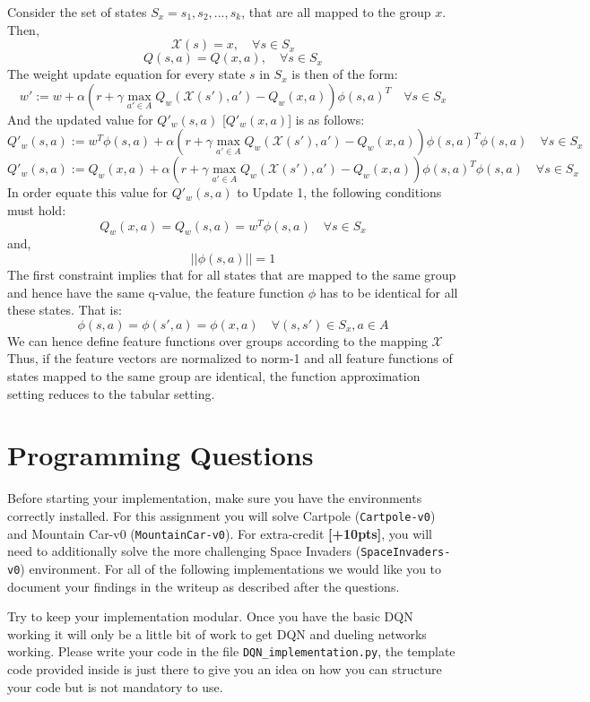 \documentclass[12pt]{article}
\begin{document}
\noindent

\begin{solution}
Consider the set of states $S_x = {s_1, s_2, ..., s_k}$, that are all mapped to the group $x$. Then, 
$$\mathcal{X}(s) = x, \quad \forall s \in S_x$$
$$Q(s,a) = Q(x,a), \quad \forall s \in S_x$$
The weight update equation for every state $s$ in $S_x$ is then of the form:
	$$w' := w + 
		\alpha \left( 
			r + \gamma \max _{a' \in A} Q _w(\mathcal{X}(s'), a') 
				- Q_w(x, a) 
		\right)\phi(s, a)^T \quad \forall s \in S_x $$
And the updated value for $Q'_{w}(s, a)$ [$Q'_{w}(x, a)$] is as follows:
	$$Q'_{w}(s, a) := w^T\phi(s, a) + 
		\alpha \left( 
			r + \gamma \max _{a' \in A} Q _w(\mathcal{X}(s'), a') 
				- Q _w(x, a) 
		\right)\phi(s, a)^T\phi(s, a) \quad \forall s \in S_x $$
	$$Q'_{w}(s, a) := Q_w(x,a) + 
		\alpha \left( 
			r + \gamma \max _{a' \in A} Q _w(\mathcal{X}(s'), a') 
				- Q _w(x, a) 
		\right)\phi(s, a)^T\phi(s, a) \quad \forall s \in S_x$$
In order equate this value for $Q'_{w}(s, a)$ to Update 1, the following conditions must hold:
$$Q_w(x,a) = Q_w(s,a) = w^T\phi(s, a) \quad \forall s \in S_x$$
and, 
$$||\phi(s, a)|| = 1$$ 
The first constraint implies that for all states that are mapped to the same group and hence have the same q-value, the feature function $\phi$ has to be identical for all these states. That is:
$$\phi(s, a) = \phi(s', a) = \phi(x,a) \quad \forall (s,s') \in S_x , a\in A$$
We can hence define feature functions over groups according to the mapping $\mathcal{X}$
Thus, if the feature vectors are normalized to norm-1 and all feature functions of states mapped to the same group are identical, the function approximation setting reduces to the tabular setting.
\end{solution}


\section{Programming Questions}
Before starting your implementation, make sure you have the environments correctly installed.
For this assignment you will solve Cartpole (\texttt{Cartpole-v0}) and Mountain Car-v0 (\texttt{MountainCar-v0}). For extra-credit \textbf{[+10pts]}, you will need to additionally solve the more challenging Space Invaders (\texttt{SpaceInvaders-v0}) environment. For all of the following implementations we would like you to document your findings in the writeup as described after the questions.

Try to keep your implementation modular. Once you have the basic DQN working it will only be a little bit of work to get DQN and dueling networks working. Please write your code in the file \texttt{DQN\_implementation.py}, the template code provided inside is just there to give you an idea on how you can structure your code but is not mandatory to use.
\end{document}
